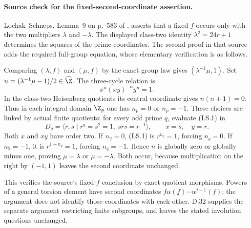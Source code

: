 \paragraph{Source check for the fixed-second-coordinate assertion.}
Lochak--Schneps, Lemma~9 on p.~583 of
\cite{R-LS}, asserts that a fixed $f$ occurs only with the two
multipliers $\lambda$ and $-\lambda$.  The displayed class-two
identity $\lambda^2=24r+1$ determines the squares of the prime
coordinates.  The second proof in that source adds the required
full-group equation, whose elementary verification is as follows.

Comparing $(\lambda,f)$ and $(\mu,f)$ by the exact group law
gives $(\lambda^{-1}\mu,1)$.  Set
$n=(\lambda^{-1}\mu-1)/2\in\widehat\Z$.
The three-cycle relation is
\[
                       x^n(xy)^{-n}y^n=1.                 \tag{LS.1}
\]
In the class-two Heisenberg quotients its central coordinate
gives $n(n+1)=0$.  Thus in each integral domain $\Z_p$ one
has $n_p=0$ or $n_p=-1$.  These choices are linked by actual
finite quotients: for every odd prime $q$, evaluate (LS.1) in
\[
 D_q=\langle r,s\mid r^q=s^2=1,\ srs=r^{-1}\rangle,
                         \qquad x=s,\quad y=r.
\]
Both $x$ and $xy$ have order two.  If $n_2=0$, (LS.1) is
$r^{n_q}=1$, forcing $n_q=0$.  If $n_2=-1$, it is
$r^{1+n_q}=1$, forcing $n_q=-1$.  Hence $n$ is globally
zero or globally minus one, proving $\mu=\lambda$ or
$\mu=-\lambda$.  Both occur, because multiplication on the
right by $(-1,1)$ leaves the second coordinate unchanged.

This verifies the source's fixed-$f$ conclusion by exact
quotient morphisms.  Powers of a general torsion element
have second coordinates $f\alpha(f)\cdots\alpha^{j-1}(f)$;
the argument does not identify those coordinates with each
other.  D.32 supplies the separate argument restricting
finite subgroups, and leaves the stated involution questions
unchanged.
